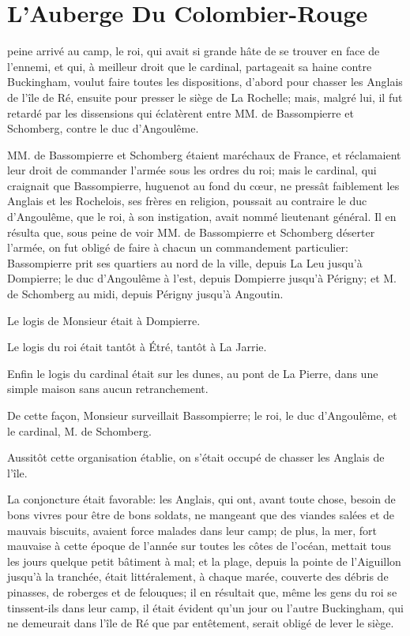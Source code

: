 
\chapter{L'Auberge Du Colombier-Rouge} 
	
\lettrine{}{} peine arrivé au camp, le roi, qui avait si grande hâte de se trouver en face de l'ennemi, et qui, à meilleur droit que le cardinal, partageait sa haine contre Buckingham, voulut faire toutes les dispositions, d'abord pour chasser les Anglais de l'île de Ré, ensuite pour presser le siège de La Rochelle; mais, malgré lui, il fut retardé par les dissensions qui éclatèrent entre MM. de Bassompierre et Schomberg, contre le duc d'Angoulême. 

MM. de Bassompierre et Schomberg étaient maréchaux de France, et réclamaient leur droit de commander l'armée sous les ordres du roi; mais le cardinal, qui craignait que Bassompierre, huguenot au fond du cœur, ne pressât faiblement les Anglais et les Rochelois, ses frères en religion, poussait au contraire le duc d'Angoulême, que le roi, à son instigation, avait nommé lieutenant général. Il en résulta que, sous peine de voir MM. de Bassompierre et Schomberg déserter l'armée, on fut obligé de faire à chacun un commandement particulier: Bassompierre prit ses quartiers au nord de la ville, depuis La Leu jusqu'à Dompierre; le duc d'Angoulême à l'est, depuis Dompierre jusqu'à Périgny; et M. de Schomberg au midi, depuis Périgny jusqu'à Angoutin. 

Le logis de Monsieur était à Dompierre. 

Le logis du roi était tantôt à Étré, tantôt à La Jarrie. 

Enfin le logis du cardinal était sur les dunes, au pont de La Pierre, dans une simple maison sans aucun retranchement. 

De cette façon, Monsieur surveillait Bassompierre; le roi, le duc d'Angoulême, et le cardinal, M. de Schomberg. 

Aussitôt cette organisation établie, on s'était occupé de chasser les Anglais de l'île. 

La conjoncture était favorable: les Anglais, qui ont, avant toute chose, besoin de bons vivres pour être de bons soldats, ne mangeant que des viandes salées et de mauvais biscuits, avaient force malades dans leur camp; de plus, la mer, fort mauvaise à cette époque de l'année sur toutes les côtes de l'océan, mettait tous les jours quelque petit bâtiment à mal; et la plage, depuis la pointe de l'Aiguillon jusqu'à la tranchée, était littéralement, à chaque marée, couverte des débris de pinasses, de roberges et de felouques; il en résultait que, même les gens du roi se tinssent-ils dans leur camp, il était évident qu'un jour ou l'autre Buckingham, qui ne demeurait dans l'île de Ré que par entêtement, serait obligé de lever le siège. 

